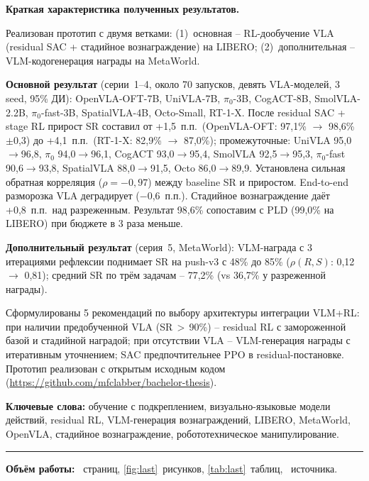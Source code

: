 \vspace{6pt}
\noindent\textbf{Краткая характеристика полученных результатов.}

Реализован прототип с двумя ветками: (1)~основная -- RL-дообучение VLA (residual SAC + стадийное вознаграждение) на LIBERO; (2)~дополнительная -- VLM-кодогенерация награды на MetaWorld.

\textbf{Основной результат} (серии~1--4, около 70 запусков, девять VLA-моделей, 3 seed, 95\% ДИ): OpenVLA-OFT-7B, UniVLA-7B, $\pi_0$-3B, CogACT-8B, SmolVLA-2.2B, $\pi_0$-fast-3B, SpatialVLA-4B, Octo-Small, RT-1-X. После residual SAC + stage RL прирост SR составил от +1,5~п.п.\ (OpenVLA-OFT: 97,1\% $\to$ 98,6\% $\pm$0,3) до +4,1~п.п.\ (RT-1-X: 82,9\% $\to$ 87,0\%); промежуточные: UniVLA 95,0$\to$96,8, $\pi_0$ 94,0$\to$96,1, CogACT 93,0$\to$95,4, SmolVLA 92,5$\to$95,3, $\pi_0$-fast 90,6$\to$93,8, SpatialVLA 88,0$\to$91,5, Octo 86,0$\to$89,9. Установлена сильная обратная корреляция ($\rho = -0{,}97$) между baseline SR и приростом. End-to-end разморозка VLA деградирует ($-$0,6~п.п.). Стадийное вознаграждение даёт +0,8~п.п.\ над разреженным. Результат 98,6\% сопоставим с PLD (99,0\% на LIBERO) при бюджете в 3 раза меньше.

\textbf{Дополнительный результат} (серия~5, MetaWorld): VLM-награда с 3 итерациями рефлексии поднимает SR на push-v3 с 48\% до 85\% ($\rho(R,S)$: 0,12 $\to$ 0,81); средний SR по трём задачам -- 77,2\% (vs 36,7\% у разреженной награды).

Сформулированы 5 рекомендаций по выбору архитектуры интеграции VLM+RL: при наличии предобученной VLA (SR\,$>$\,90\%) -- residual RL с замороженной базой и стадийной наградой; при отсутствии VLA -- VLM-генерация награды с итеративным уточнением; SAC предпочтительнее PPO в residual-постановке. Прототип реализован с открытым исходным кодом (\url{https://github.com/mfclabber/bachelor-thesis}).

\vspace{6pt}
\noindent\textbf{Ключевые слова:} обучение с подкреплением, визуально-языковые модели действий, residual RL, VLM-генерация вознаграждений, LIBERO, MetaWorld, OpenVLA, стадийное вознаграждение, робототехническое манипулирование.

\vspace{6pt}
\noindent\rule{\textwidth}{0.4pt}

\vspace{6pt}
\noindent\textbf{Объём работы:} \pageref{LastPage}~страниц, \ref{fig:last}~рисунков, \ref{tab:last}~таблиц, \printbibcount~источника.

\clearpage
